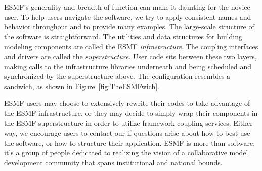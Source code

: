 ESMF's generality and breadth of function can make it daunting for the
novice user.  To help users navigate the software, we try to apply
consistent names and behavior throughout and to provide many examples.
The large-scale structure of the software is straightforward.
The utilities and data structures for building modeling components 
are called the ESMF {\it infrastructure}.  The coupling interfaces and
drivers are called the {\it superstructure}.  User code sits between
these two layers, making calls to the infrastructure
libraries underneath and being scheduled and synchronized by the 
superstructure above.  The configuration resembles a sandwich, as
shown in Figure~\ref{fig:TheESMFwich}.

ESMF users may choose to extensively rewrite their codes
to take advantage of the ESMF infrastructure, or they may decide to
simply wrap their components in the ESMF superstructure in order to
utilize framework coupling services.  Either way, we encourage users
to contact our 
 if questions arise about how to best
use the software, or how to structure their application.  ESMF is
more than software;  it's a group of people dedicated to realizing
the vision of a collaborative model development community that spans
institutional and national bounds.

